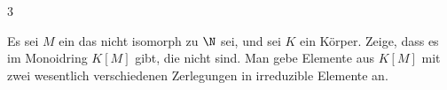 {3}
{





Es sei $M$ ein
das nicht isomorph zu $\N$ sei, und sei $K$ ein Körper. Zeige, dass es im Monoidring $K[M]$ 
gibt, die nicht
sind. Man gebe Elemente aus $K[M]$ mit zwei wesentlich verschiedenen Zerlegungen in irreduzible Elemente an.





}
{} {}
